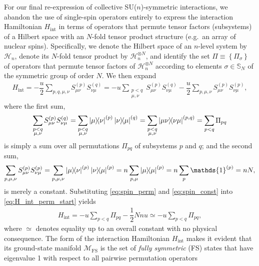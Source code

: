 \documentclass[nofootinbib,notitlepage,11pt]{revtex4-2}
\renewcommand{\t}{\text} %
\newcommand{\f}[2]{\dfrac{#1}{#2}} %
\renewcommand{\set}[1]{\left\{#1\right\}} %
\newcommand{\1}{\mathds{1}}
\renewcommand{\H}{\mathcal{H}}
\newcommand{\M}{\mathcal{M}}
\renewcommand{\SS}{\mathbb{S}}
\newcommand{\FS}{\text{FS}}
\begin{document}
For our final re-expression of collective SU($n$)-symmetric
interactions, we abandon the use of single-spin operators entirely to
express the interaction Hamiltonian $H_{\t{int}}$ in terms of
operators that permute tensor factors (subsystems) of a Hilbert space
with an $N$-fold tensor product structure (e.g.~an array of nuclear
spins).  Specifically, we denote the Hilbert space of an $n$-level
system by $\H_n$, denote its $N$-fold tensor product by
$\H_n^{\otimes N}$, and identify the set $\Pi\equiv\set{\Pi_\sigma}$
of operators that permute tensor factors of $\H_n^{\otimes N}$
according to elements $\sigma\in\SS_N$ of the symmetric group of order
$N$.  We then expand
\begin{align}
  H_{\t{int}}
  = -\f{u}{2} \sum_{p,q,\mu,\nu} S_{\mu\nu}^{(p)} S_{\nu\mu}^{(q)}
  = -u\sum_{\substack{p<q\\\mu,\nu}} S_{\mu\nu}^{(p)} S_{\nu\mu}^{(q)}
  - \f{u}{2} \sum_{p,\mu,\nu} S_{\mu\nu}^{(p)} S_{\nu\mu}^{(p)},
  \label{eq:H_int_perm_start}
\end{align}
where the first sum,
\begin{align}
  \sum_{\substack{p<q\\\mu,\nu}} S_{\mu\nu}^{(p)} S_{\nu\mu}^{(q)}
  = \sum_{\substack{p<q\\\mu,\nu}} \op{\mu}{\nu}^{(p)} \op{\nu}{\mu}^{(q)}
  = \sum_{\substack{p<q\\\mu,\nu}} \op{\mu\nu}{\nu\mu}^{(p,q)}
  = \sum_{p<q} \Pi_{pq}
  \label{eq:spin_perm}
\end{align}
is simply a sum over all permutations $\Pi_{pq}$ of subsystems $p$ and
$q$; and the second sum,
\begin{align}
  \sum_{p,\mu,\nu} S_{\mu\nu}^{(p)} S_{\nu\mu}^{(p)}
  = \sum_{p,\mu,\nu} \op{\mu}{\nu}^{(p)} \op{\nu}{\mu}^{(p)}
  = n \sum_{p,\mu} \op{\mu}{\mu}^{(p)}
  = n \sum_p \1^{(p)}
  = n N,
  \label{eq:spin_const}
\end{align}
is merely a constant.  Substituting \eqref{eq:spin_perm} and
\eqref{eq:spin_const} into \eqref{eq:H_int_perm_start} yields
\begin{align}
  H_{\t{int}} = -u \sum_{p<q} \Pi_{pq} - \f12 N n u
  \simeq -u\sum_{p<q} \Pi_{pq},
  \label{eq:H_int_perm}
\end{align}
where $\simeq$ denotes equality up to an overall constant with no
physical consequence.  The form of the interaction Hamiltonian
$H_{\t{int}}$ makes it evident that its ground-state manifold
$\M_{\FS}$ is the set of {\it fully symmetric} (FS) states that have
eigenvalue 1 with respect to all pairwise permutation operators
\end{document}
